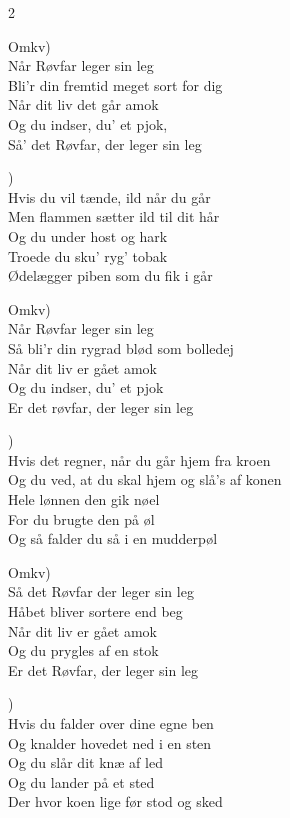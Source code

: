 \documentclass[a4paper,12pt]{memoir}
\begin{document}
\begin{multicols}{2}
\raggedcolumns

\noindent Omkv)\\
Når Røvfar leger sin leg\\
Bli’r din fremtid meget sort for dig\\
Når dit liv det går amok\\
Og du indser, du’ et pjok,\\
Så’ det Røvfar, der leger sin leg

\medskip

)\\
Hvis du vil tænde, ild når du går\\
Men flammen sætter ild til dit hår\\
Og du under host og hark\\
Troede du sku’ ryg’ tobak\\
Ødelægger piben som du fik i går

\medskip

\noindent Omkv)\\
Når Røvfar leger sin leg\\
Så bli’r din rygrad blød som bolledej\\
Når dit liv er gået amok\\
Og du indser, du’ et pjok\\
Er det røvfar, der leger sin leg

\medskip

)\\
Hvis det regner, når du går hjem fra kroen\\
Og du ved, at du skal hjem og slå’s af konen\\
Hele lønnen den gik nøel\\
For du brugte den på øl\\
Og så falder du så i en mudderpøl

\medskip

\noindent Omkv)\\
Så det Røvfar der leger sin leg\\
Håbet bliver sortere end beg\\
Når dit liv er gået amok\\
Og du prygles af en stok\\
Er det Røvfar, der leger sin leg

\medskip

)\\
Hvis du falder over dine egne ben\\
Og knalder hovedet ned i en sten\\
Og du slår dit knæ af led\\
Og du lander på et sted\\
Der hvor koen lige før stod og sked


\end{multicols}
\end{document}
